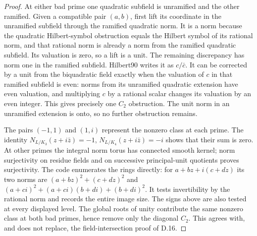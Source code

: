 \begin{proof}
At either bad prime one quadratic subfield is unramified and the other ramified. Given a compatible pair $(a,b)$, first lift its coordinate in the unramified subfield through the ramified quadratic norm. It is a norm because the quadratic Hilbert-symbol obstruction equals the Hilbert symbol of its rational norm, and that rational norm is already a norm from the ramified quadratic subfield. Its valuation is zero, so a lift is a unit. The remaining discrepancy has norm one in the ramified subfield. Hilbert90 writes it as $c/\bar c$. It can be corrected by a unit from the biquadratic field exactly when the valuation of $c$ in that ramified subfield is even: norms from its unramified quadratic extension have even valuation, and multiplying $c$ by a rational scalar changes its valuation by an even integer. This gives precisely one $C_2$ obstruction. The unit norm in an unramified extension is onto, so no further obstruction remains.

The pairs $(-1,1)$ and $(1,i)$ represent the nonzero class at each prime. The identity
$N_{L/K_3}(z+i\bar z)=-1$, $N_{L/K_4}(z+i\bar z)=-i$
shows that their sum is zero. At other primes the integral norm torus has connected smooth kernel; norm surjectivity on residue fields and on successive principal-unit quotients proves surjectivity. The code enumerates the rings directly: for $a+bz+i(c+dz)$ its two norms are
$(a+bz)^2+(c+dz)^2$ and
$(a+ci)^2+(a+ci)(b+di)+(b+di)^2$.
It tests invertibility by the rational norm and records the entire image size. The signs above are also tested at every displayed level. The global roots of unity contribute the same nonzero class at both bad primes, hence remove only the diagonal $C_2$. This agrees with, and does not replace, the field-intersection proof of D.16.
\end{proof}

